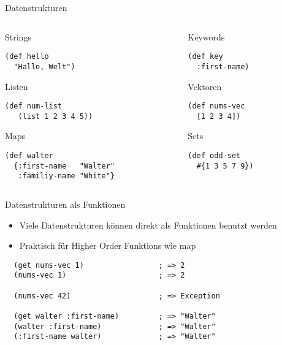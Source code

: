 \documentclass[presentation]{beamer}
\begin{document}
\begin{frame}[fragile]{Datenstrukturen}
  \begin{columns}
    \begin{column}{0.5\textwidth}
      \begin{block}{Strings}
\begin{verbatim}
(def hello
  "Hallo, Welt")
\end{verbatim}
      \end{block}
      \begin{block}{Listen}
\begin{verbatim}
(def num-list
   (list 1 2 3 4 5))
\end{verbatim}
      \end{block}
      \begin{block}{Maps}
\begin{verbatim}
(def walter
  {:first-name   "Walter"
   :familiy-name "White"}
\end{verbatim}
      \end{block}
    \end{column}
    \begin{column}{0.5\textwidth}
      \begin{block}{Keywords}
\begin{verbatim}
(def key
  :first-name)
\end{verbatim}
      \end{block}
      \begin{block}{Vektoren}
\begin{verbatim}
(def nums-vec
  [1 2 3 4])
\end{verbatim}
      \end{block}
      \begin{block}{Sets}
\begin{verbatim}
(def odd-set
  #{1 3 5 7 9})
\end{verbatim}
      \end{block}
    \end{column}
  \end{columns}
\end{frame}

\begin{frame}[fragile]{Datenstrukturen als Funktionen}
  \begin{itemize}
  \item Viele Datenstrukturen können direkt als Funktionen benutzt werden
  \item Praktisch für Higher Order Funktions wie map
  \end{itemize}
  \begin{block}{}
\begin{verbatim}
  (get nums-vec 1)                 ; => 2
  (nums-vec 1)                     ; => 2

  (nums-vec 42)                    ; => Exception

  (get walter :first-name)         ; => "Walter"
  (walter :first-name)             ; => "Walter"
  (:first-name walter)             ; => "Walter"
\end{verbatim}

  \end{block}
\end{frame}
\end{document}
